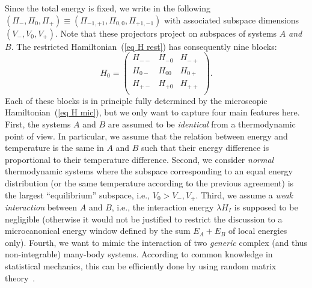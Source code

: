 \documentclass[pre,twocolumn,10pt,aps,longbibliography,nofootinbib]{revtex4-1}
\begin{document}
Since the total energy is fixed, we write in the following $(\Pi_-,\Pi_0,\Pi_+) \equiv (\Pi_{-1,+1},\Pi_{0,0},\Pi_{+1,-1})$ with associated subspace dimensions $(V_-,V_0,V_+)$. Note that these projectors project on subspaces of systems $A$ \emph{and} $B$. The restricted Hamiltonian~(\ref{eq H rest}) has consequently nine blocks:
\begin{equation}\label{eq block H}
 H_0 = \begin{pmatrix}
        H_{--} & H_{-0} & H_{-+} \\
        H_{0-} & H_{00} & H_{0+} \\
        H_{+-} & H_{+0} & H_{++} \\
       \end{pmatrix}.
\end{equation}
Each of these blocks is in principle fully determined by the microscopic Hamiltonian~(\ref{eq H mic}), but we only want to capture four main features here. First, the systems $A$ and $B$ are assumed to be \emph{identical} from a thermodynamic point of view. In particular, we assume that the relation between energy and temperature is the same in $A$ and $B$ such that their energy difference is proportional to their temperature difference. Second, we consider \emph{normal} thermodynamic systems where the subspace corresponding to an equal energy distribution (or the same temperature according to the previous agreement) is the largest ``equilibrium'' subspace, i.e., $V_0 > V_-,V_+$. Third, we assume a \emph{weak interaction} between $A$ and $B$, i.e., the interaction energy $\lambda H_I$ is supposed to be negligible (otherwise it would not be justified to restrict the discussion to a microcanonical energy window defined by the sum $E_A+E_B$ of local energies only). Fourth, we want to mimic the interaction of two \emph{generic} complex (and thus non-integrable) many-body systems. According to common knowledge in statistical mechanics, this can be efficiently done by using random matrix theory~\cite{Wigner1967, BrodyEtAlRMP1981, BeenakkerRMP1997, GuhrMuellerGroelingWeidenmuellerPR1998, HaakeBook2010, DAlessioEtAlAP2016, DeutschRPP2018}.
\end{document}
